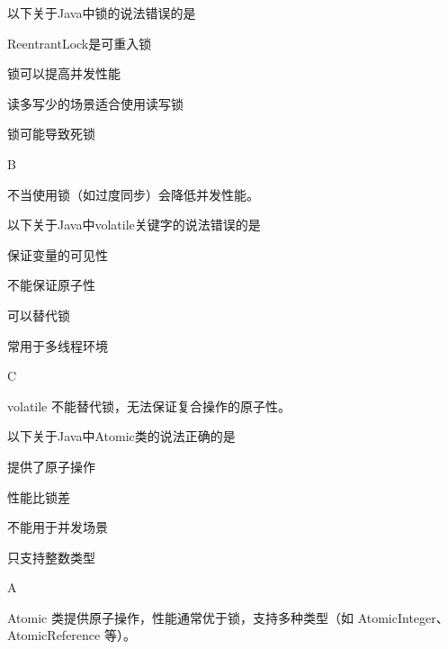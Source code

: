 \begin{question}
	以下关于Java中锁的说法错误的是
	\begin{options}
		\item ReentrantLock是可重入锁
		\item 锁可以提高并发性能
		\item 读多写少的场景适合使用读写锁
		\item 锁可能导致死锁
	\end{options}
	\begin{answer}
		B
	\end{answer}
	\begin{explanation}
		不当使用锁（如过度同步）会降低并发性能。
	\end{explanation}
\end{question}

\begin{question}
	以下关于Java中volatile关键字的说法错误的是
	\begin{options}
		\item 保证变量的可见性
		\item 不能保证原子性
		\item 可以替代锁
		\item 常用于多线程环境
	\end{options}
	\begin{answer}
		C
	\end{answer}
	\begin{explanation}
		volatile 不能替代锁，无法保证复合操作的原子性。
	\end{explanation}
\end{question}

\begin{question}
	以下关于Java中Atomic类的说法正确的是
	\begin{options}
		\item 提供了原子操作
		\item 性能比锁差
		\item 不能用于并发场景
		\item 只支持整数类型
	\end{options}
	\begin{answer}
		A
	\end{answer}
	\begin{explanation}
		Atomic 类提供原子操作，性能通常优于锁，支持多种类型（如 AtomicInteger、AtomicReference 等）。
	\end{explanation}
\end{question}

